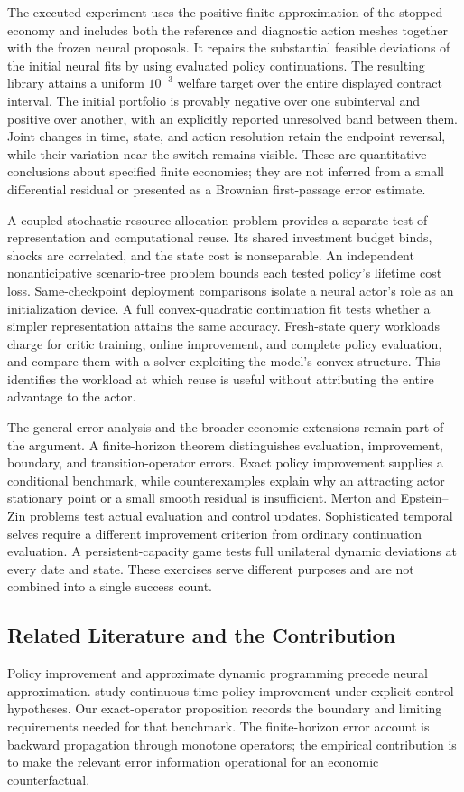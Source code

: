 The executed experiment uses the positive finite approximation of the stopped economy and includes both the reference and diagnostic action meshes together with the frozen neural proposals. It repairs the substantial feasible deviations of the initial neural fits by using evaluated policy continuations. The resulting library attains a uniform $10^{-3}$ welfare target over the entire displayed contract interval. The initial portfolio is provably negative over one subinterval and positive over another, with an explicitly reported unresolved band between them. Joint changes in time, state, and action resolution retain the endpoint reversal, while their variation near the switch remains visible. These are quantitative conclusions about specified finite economies; they are not inferred from a small differential residual or presented as a Brownian first-passage error estimate.

A coupled stochastic resource-allocation problem provides a separate test of representation and computational reuse. Its shared investment budget binds, shocks are correlated, and the state cost is nonseparable. An independent nonanticipative scenario-tree problem bounds each tested policy's lifetime cost loss. Same-checkpoint deployment comparisons isolate a neural actor's role as an initialization device. A full convex-quadratic continuation fit tests whether a simpler representation attains the same accuracy. Fresh-state query workloads charge for critic training, online improvement, and complete policy evaluation, and compare them with a solver exploiting the model's convex structure. This identifies the workload at which reuse is useful without attributing the entire advantage to the actor.

The general error analysis and the broader economic extensions remain part of the argument. A finite-horizon theorem distinguishes evaluation, improvement, boundary, and transition-operator errors. Exact policy improvement supplies a conditional benchmark, while counterexamples explain why an attracting actor stationary point or a small smooth residual is insufficient. Merton and Epstein--Zin problems test actual evaluation and control updates. Sophisticated temporal selves require a different improvement criterion from ordinary continuation evaluation. A persistent-capacity game tests full unilateral dynamic deviations at every date and state. These exercises serve different purposes and are not combined into a single success count.

\subsection{Related Literature and the Contribution}
Policy improvement and approximate dynamic programming precede neural approximation. \citet{jacka2015} study continuous-time policy improvement under explicit control hypotheses. Our exact-operator proposition records the boundary and limiting requirements needed for that benchmark. The finite-horizon error account is backward propagation through monotone operators; the empirical contribution is to make the relevant error information operational for an economic counterfactual.

